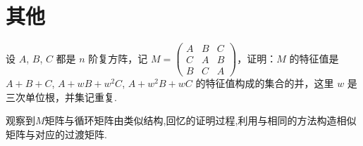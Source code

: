 \documentclass[../../main.tex]{subfiles}%
\begin{document}
\section{其他}

\begin{example}
设 $A$, $B$, $C$ 都是 $n$ 阶复方阵，记 $M = \begin{pmatrix}
A & B & C \\
C & A & B \\
B & C & A
\end{pmatrix}$，证明：$M$ 的特征值是 $A + B + C$, $A + wB + w^{2}C$, $A + w^{2}B + wC$ 的特征值构成的集合的并，这里 $w$ 是三次单位根，并集记重复. 
\end{example}
\begin{note}
观察到$M$矩阵与循环矩阵由类似结构,回忆的证明过程,利用与相同的方法构造相似矩阵与对应的过渡矩阵.
\end{note}
\end{document}
